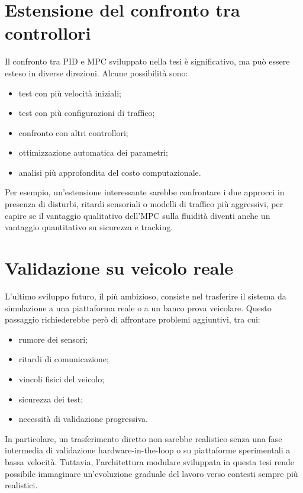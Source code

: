 \section{Estensione del confronto tra controllori}

Il confronto tra PID e MPC sviluppato nella tesi è significativo, ma può essere esteso in diverse direzioni. Alcune possibilità sono:

\begin{itemize}
    \item test con più velocità iniziali;
    \item test con più configurazioni di traffico;
    \item confronto con altri controllori;
    \item ottimizzazione automatica dei parametri;
    \item analisi più approfondita del costo computazionale.
\end{itemize}

Per esempio, un'estensione interessante sarebbe confrontare i due approcci in presenza di disturbi, ritardi sensoriali o modelli di traffico più aggressivi, per capire se il vantaggio qualitativo dell'MPC sulla fluidità diventi anche un vantaggio quantitativo su sicurezza e tracking.

\section{Validazione su veicolo reale}

L'ultimo sviluppo futuro, il più ambizioso, consiste nel trasferire il sistema da simulazione a una piattaforma reale o a un banco prova veicolare. Questo passaggio richiederebbe però di affrontare problemi aggiuntivi, tra cui:

\begin{itemize}
    \item rumore dei sensori;
    \item ritardi di comunicazione;
    \item vincoli fisici del veicolo;
    \item sicurezza dei test;
    \item necessità di validazione progressiva.
\end{itemize}

In particolare, un trasferimento diretto non sarebbe realistico senza una fase intermedia di validazione hardware-in-the-loop o su piattaforme sperimentali a bassa velocità. Tuttavia, l'architettura modulare sviluppata in questa tesi rende possibile immaginare un'evoluzione graduale del lavoro verso contesti sempre più realistici.
